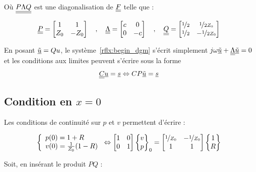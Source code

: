 Où $\underline{\underline{P\Lambda Q}}$ est une diagonalisation de $\underline{\underline{F}}$ telle que :

\[
\underline{\underline{P}} = \begin{bmatrix}1 & 1\\Z_0 & -Z_0\end{bmatrix} \quad,\quad
\underline{\underline{\Lambda}} = \begin{bmatrix}c & 0\\0 & -c\end{bmatrix} \quad,\quad
\underline{\underline{Q}} = \begin{bmatrix}
	\nicefrac{1}{2} & \nicefrac{1}{2Z_0}\\
	\nicefrac{1}{2} & -\nicefrac{1}{2Z_0}\\
\end{bmatrix}
\]

En posant $\underline{\tilde{u}} = Qu$, le système~\eqref{rflx:begin_dgm} s'écrit simplement $j\omega\underline{\tilde{u}} +
\underline{\underline{\Lambda}}\underline{\tilde{u}} = 0$ et les conditions aux limites peuvent s'écrire sous la forme $$\underline{\underline{C}}\underline{u} = \underline{s} \Leftrightarrow
CP\underline{\tilde{u}} = \underline{s}$$

\subsection{Condition en $x=0$}

Les conditions de continuité sur $p$ et $v$ permettent d'écrire :

\begin{equation*}
	\left\{
		\begin{array}{l}
			p(0) = 1 + R\\
			v(0) = \frac{1}{Z_0}(1-R)
		\end{array}
	\right.
	\Leftrightarrow
	\begin{bmatrix}
		1 & 0\\
		0 & 1
	\end{bmatrix}
	\begin{Bmatrix}
		v\\
		p
	\end{Bmatrix}_0 = 
	\begin{bmatrix}
		\nicefrac{1}{Z_0} & -\nicefrac{1}{Z_0}\\
		1 & 1
	\end{bmatrix}
	\begin{Bmatrix}
		1\\
		R
	\end{Bmatrix}
\end{equation*}

Soit, en insérant le produit $PQ$ :

